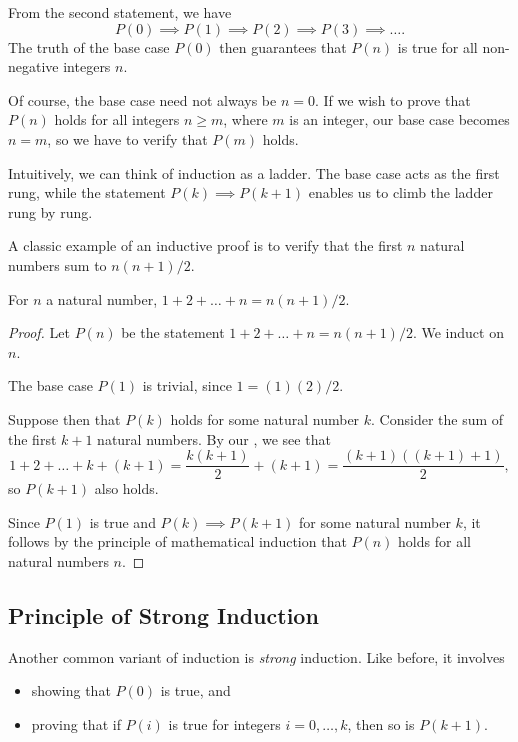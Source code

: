 From the second statement, we have \[P(0) \implies P(1) \implies P(2) \implies P(3) \implies \dots.\] The truth of the base case $P(0)$ then guarantees that $P(n)$ is true for all non-negative integers $n$.

Of course, the base case need not always be $n = 0$. If we wish to prove that $P(n)$ holds for all integers $n \geq m$, where $m$ is an integer, our base case becomes $n = m$, so we have to verify that $P(m)$ holds.

Intuitively, we can think of induction as a ladder. The base case acts as the first rung, while the statement $P(k) \implies P(k+1)$ enables us to climb the ladder rung by rung.

A classic example of an inductive proof is to verify that the first $n$ natural numbers sum to $n(n+1)/2$.

\begin{statement}
    For $n$ a natural number, $1 + 2 + \dots + n = n(n+1)/2$.
\end{statement}
\begin{proof}
    Let $P(n)$ be the statement $1 + 2 + \dots + n = n(n+1)/2$. We induct on $n$.

    The base case $P(1)$ is trivial, since $1 = (1)(2)/2$. 
    
    Suppose then that $P(k)$ holds for some natural number $k$. Consider the sum of the first $k+1$ natural numbers. By our , we see that \[1 + 2 + \dots + k + (k+1) = \frac{k(k+1)}{2} + (k + 1) = \frac{(k+1)((k+1) + 1)}{2},\] so $P(k+1)$ also holds.
    
    Since $P(1)$ is true and $P(k) \implies P(k+1)$ for some natural number $k$, it follows by the principle of mathematical induction that $P(n)$ holds for all natural numbers $n$.
\end{proof}

\subsection{Principle of Strong Induction}

Another common variant of induction is \emph{strong} induction. Like before, it involves
\begin{itemize}
    \item showing that $P(0)$ is true, and
    \item proving that if $P(i)$ is true for integers $i = 0, \dots, k$, then so is $P(k+1)$.
\end{itemize}

